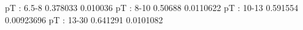 pT : 6.5-8
0.378033 0.010036
pT : 8-10
0.50688 0.0110622
pT : 10-13
0.591554 0.00923696
pT : 13-30
0.641291 0.0101082
